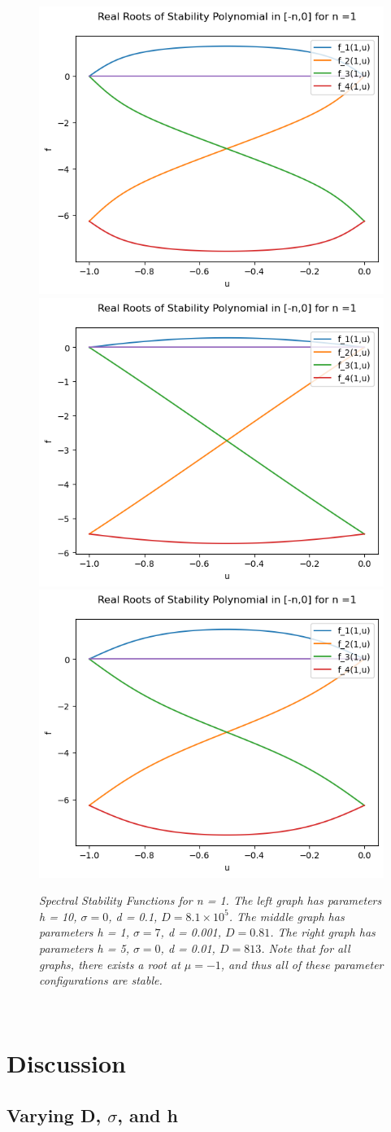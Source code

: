 \documentclass{article}
\begin{document}
\begin{figure}[hbt!]
\centering
\includegraphics[width=.3\textwidth]{special4.png}\hfill
\includegraphics[width=.3\textwidth]{special5.png}\hfill
\includegraphics[width=.3\textwidth]{special6.png}\hfill
\caption{\emph{Spectral Stability Functions for n = 1. The left graph has parameters h = 10, \(\sigma = 0\), d = 0.1, \(D = 8.1 \times 10^5\). The middle graph has parameters h = 1, \(\sigma = 7\), d = 0.001, \(D = 0.81\). The right graph has parameters h = 5, \(\sigma = 0\), d = 0.01, \(D = 813\). Note that for all graphs, there exists a root at \(\mu = -1\), and thus all of these parameter configurations are stable. }} \label{n=1}
\label{n=2}
\end{figure}
\\

\clearpage 

\section{Discussion}


\subsection{Varying D, \(\sigma\), and h}
\end{document}
